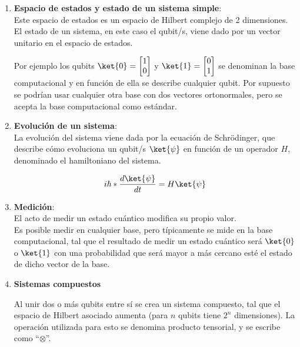 \begin{enumerate}
\item \textbf{Espacio de estados y estado de un sistema simple}:
  \\
  Este espacio de estados es un espacio de Hilbert complejo de 2 dimensiones.
  El estado de un sistema, en este caso el qubit/s, viene dado por un vector unitario en el espacio de estados.
  
  Por ejemplo los qubits $\ket{0} = \begin{bmatrix} 1 \\ 0 \end{bmatrix}$ y $\ket{1} = \begin{bmatrix} 0 \\ 1 \end{bmatrix}$ se denominan la base computacional y en función de ella se describe cualquier qubit.
  Por supuesto se podrían usar cualquier otra base con dos vectores ortonormales, pero se acepta la base computacional como estándar.
  
\item \textbf{Evolución de un sistema}:
  \\
  La evolución del sistema viene dada por la ecuación de Schrödinger, que describe cómo evoluciona un qubit/s $\ket{\psi}$ en función de un operador $H$, denominado el hamiltoniano del sistema.

  \begin{align}
    i \hbar * \frac{d \ket{\psi}}{d t} = H \ket{\psi}
  \end{align}
  
\item \textbf{Medición}:
  \\
  El acto de medir un estado cuántico modifica su propio valor.
  \\
  Es posible medir en cualquier base, pero típicamente se mide en la base computacional, tal que el resultado de medir un estado cuántico será $\ket{0}$ o $\ket{1}$ con una probabilidad que será mayor a más cercano esté el estado de dicho vector de la base.

\item \textbf{Sistemas compuestos}

  Al unir dos o más qubits entre sí se crea un sistema compuesto, tal que el espacio de Hilbert asociado aumenta (para $n$ qubits tiene $2^n$ dimensiones).
  La operación utilizada para esto se denomina producto tensorial, y se escribe como ``$\otimes$''.

\end{enumerate}



